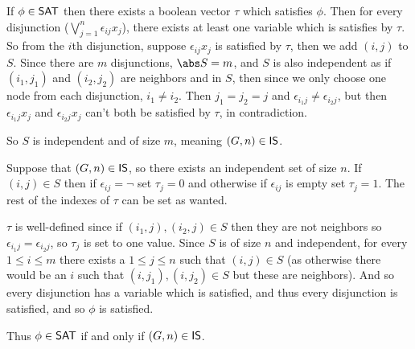\documentclass[10pt]{article}
\begin{document}
If $\phi\in\mathsf{SAT}$ then there exists a boolean vector $\tau$ which satisfies $\phi$.
Then for every disjunction ($\bigvee_{j=1}^n\epsilon_{ij}x_j$), there exists at least one variable which is satisfies by $\tau$.
So from the $i$th disjunction, suppose $\epsilon_{ij}x_j$ is satisfied by $\tau$, then we add $(i,j)$ to $S$.
Since there are $m$ disjunctions, $\abs S=m$, and $S$ is also independent as if $(i_1,j_1)$ and $(i_2,j_2)$ are neighbors and in $S$, then since we only choose one node from each disjunction, $i_1\neq i_2$.
Then $j_1=j_2=j$ and $\epsilon_{i_1j}\neq\epsilon_{i_2j}$, but then $\epsilon_{i_1j}x_j$ and $\epsilon_{i_2j}x_j$ can't both be satisfied by $\tau$, in contradiction.

So $S$ is independent and of size $m$, meaning $(G,n)\in\mathsf{IS}$.

Suppose that $(G,n)\in\mathsf{IS}$, so there exists an independent set of size $n$.
If $(i,j)\in S$ then if $\epsilon_{ij}=\neg$ set $\tau_j=0$ and otherwise if $\epsilon_{ij}$ is empty set $\tau_j=1$.
The rest of the indexes of $\tau$ can be set as wanted.

$\tau$ is well-defined since if $(i_1,j),(i_2,j)\in S$ then they are not neighbors so $\epsilon_{i_1j}=\epsilon_{i_2j}$, so $\tau_j$ is set to one value.
Since $S$ is of size $n$ and independent, for every $1\leq i\leq m$ there exists a $1\leq j\leq n$ such that $(i,j)\in S$ (as otherwise there would be an $i$ such that $(i,j_1),(i,j_2)\in S$ but these are
neighbors).
And so every disjunction has a variable which is satisfied, and thus every disjunction is satisfied, and so $\phi$ is satisfied.

Thus $\phi\in\mathsf{SAT}$ if and only if $(G,n)\in\mathsf{IS}$.
\end{document}
